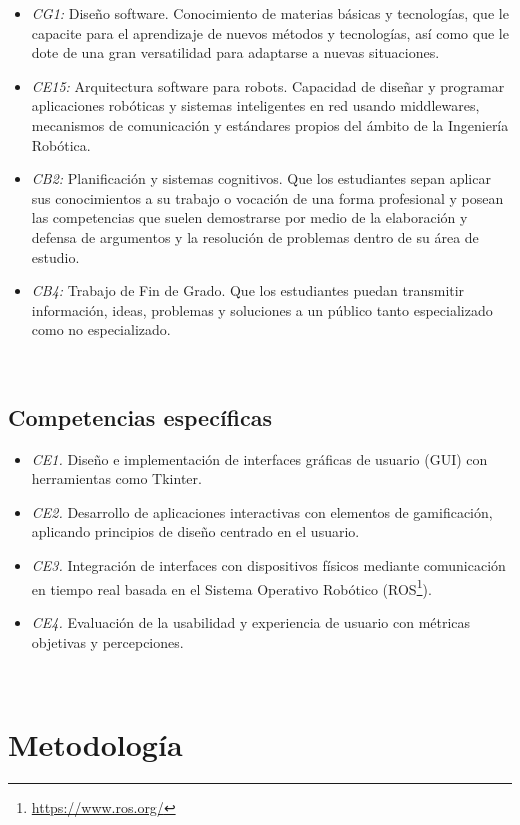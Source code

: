 \begin{itemize}
    \item \textit{CG1:} Diseño software. Conocimiento de materias básicas y tecnologías, que le capacite para el aprendizaje de nuevos métodos y tecnologías, así como que le dote de una gran versatilidad para adaptarse a nuevas situaciones.
    \item \textit{CE15:} Arquitectura software para robots. Capacidad de diseñar y programar aplicaciones robóticas y sistemas inteligentes en red usando middlewares, mecanismos de comunicación y estándares propios del ámbito de la Ingeniería Robótica.
    \item \textit{CB2:} Planificación y sistemas cognitivos. Que los estudiantes sepan aplicar sus conocimientos a su trabajo o vocación de una forma profesional y posean las competencias que suelen demostrarse por medio de la elaboración y defensa de argumentos y la resolución de problemas dentro de su área de estudio.
    \item \textit{CB4:} Trabajo de Fin de Grado. Que los estudiantes puedan transmitir información, ideas, problemas y soluciones a un público tanto especializado como no especializado.
\end{itemize}\

\subsection{Competencias específicas}
\label{sec:competencias}

\begin{itemize}
    \item \textit{CE1.} Diseño e implementación de interfaces gráficas de usuario (GUI) con herramientas como Tkinter.
    \item \textit{CE2.} Desarrollo de aplicaciones interactivas con elementos de gamificación, aplicando principios de diseño centrado en el usuario.
    \item \textit{CE3.} Integración de interfaces con dispositivos físicos mediante comunicación en tiempo real basada en el Sistema Operativo Robótico (ROS\footnote{\url{https://www.ros.org/}}).
    \item \textit{CE4.} Evaluación de la usabilidad y experiencia de usuario con métricas objetivas y percepciones.
\end{itemize}\

\section{Metodología}
\label{sec:metodologia}

